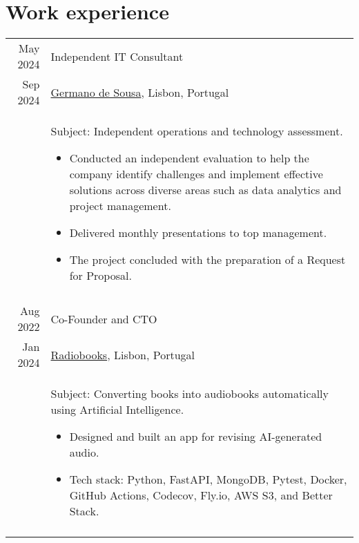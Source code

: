 \section{Work experience}

\begin{tabular}{r|p{\tabwidth}}

  {\small May 2024} 	& Independent IT Consultant \\[\datespace]
  {\small Sep 2024} 	& {\small \href{https://www.germanodesousa.com/en/}{Germano de Sousa}, Lisbon, Portugal} \\[\title-main-sep]
  & {
    \parbox[t]{\tabwidth}{
    \footnotesize Subject: Independent operations and technology assessment.
    \begin{itemize}[topsep=0pt, partopsep=0pt, parsep=0pt, itemsep=0pt, leftmargin=*, after=\vspace{0pt}]
      \item Conducted an independent evaluation to help the company identify challenges and implement effective solutions across diverse areas such as data analytics and project management.
      \item Delivered monthly presentations to top management.
      \item The project concluded with the preparation of a Request for Proposal. 
    \end{itemize}
    }
  } \\
  \multicolumn{2}{c}{} \\

  {\small Aug 2022} & Co-Founder and CTO \\[\datespace]
  {\small Jan 2024} & {\small \href{https://radiobooks.webflow.io/}{Radiobooks}, Lisbon, Portugal} \\[\title-main-sep]
  & {
  \parbox[t]{\tabwidth}{
  \footnotesize Subject: Converting books into audiobooks automatically using Artificial Intelligence.
  \begin{itemize}[topsep=0pt, partopsep=0pt, parsep=0pt, itemsep=0pt, leftmargin=*, after=\vspace{0pt}]
    \item Designed and built an app for revising AI-generated audio.
    \item Tech stack: Python, FastAPI, MongoDB, Pytest, Docker, GitHub Actions, Codecov, Fly.io, AWS S3, and Better Stack.
  \end{itemize}
  }
  } \\
  \multicolumn{2}{c}{} \\


\end{tabular}
